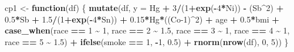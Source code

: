\documentclass[12pt, twoside]{amherstthesis}
\newenvironment{Shaded}{\begin{snugshade}}{\end{snugshade}}
\newcommand{\AttributeTok}[1]{\textcolor[rgb]{0.13,0.29,0.53}{#1}}
\newcommand{\ControlFlowTok}[1]{\textcolor[rgb]{0.13,0.29,0.53}{\textbf{#1}}}
\newcommand{\DecValTok}[1]{\textcolor[rgb]{0.00,0.00,0.81}{#1}}
\newcommand{\FloatTok}[1]{\textcolor[rgb]{0.00,0.00,0.81}{#1}}
\newcommand{\FunctionTok}[1]{\textcolor[rgb]{0.13,0.29,0.53}{\textbf{#1}}}
\newcommand{\NormalTok}[1]{#1}
\newcommand{\OtherTok}[1]{\textcolor[rgb]{0.56,0.35,0.01}{#1}}
\newcommand{\SpecialCharTok}[1]{\textcolor[rgb]{0.81,0.36,0.00}{\textbf{#1}}}
\begin{document}
\begin{Shaded}
\begin{Highlighting}[]
\NormalTok{cp1 }\OtherTok{\textless{}{-}} \ControlFlowTok{function}\NormalTok{(df) \{}
  \FunctionTok{mutate}\NormalTok{(df, }\AttributeTok{y =} 
\NormalTok{           Hg }\SpecialCharTok{+} \DecValTok{3}\SpecialCharTok{/}\NormalTok{(}\DecValTok{1}\SpecialCharTok{+}\FunctionTok{exp}\NormalTok{(}\SpecialCharTok{{-}}\DecValTok{4}\SpecialCharTok{*}\NormalTok{Ni)) }\SpecialCharTok{{-}}\NormalTok{ (Sb}\SpecialCharTok{\^{}}\DecValTok{2}\NormalTok{) }\SpecialCharTok{+} \FloatTok{0.5}\SpecialCharTok{*}\NormalTok{Sb }\SpecialCharTok{+} \FloatTok{1.5}\SpecialCharTok{/}\NormalTok{(}\DecValTok{1}\SpecialCharTok{+}\FunctionTok{exp}\NormalTok{(}\SpecialCharTok{{-}}\DecValTok{4}\SpecialCharTok{*}\NormalTok{Sn)) }\SpecialCharTok{+} 
           \FloatTok{0.15}\SpecialCharTok{*}\NormalTok{Hg}\SpecialCharTok{*}\NormalTok{((Co}\DecValTok{{-}1}\NormalTok{)}\SpecialCharTok{\^{}}\DecValTok{2}\NormalTok{) }\SpecialCharTok{+}
\NormalTok{           age }\SpecialCharTok{+} \FloatTok{0.5}\SpecialCharTok{*}\NormalTok{bmi }\SpecialCharTok{+} 
           \FunctionTok{case\_when}\NormalTok{(race }\SpecialCharTok{==} \DecValTok{1} \SpecialCharTok{\textasciitilde{}} \DecValTok{1}\NormalTok{, }
\NormalTok{                     race }\SpecialCharTok{==} \DecValTok{2} \SpecialCharTok{\textasciitilde{}} \FloatTok{1.5}\NormalTok{, }
\NormalTok{                     race }\SpecialCharTok{==} \DecValTok{3} \SpecialCharTok{\textasciitilde{}} \DecValTok{1}\NormalTok{, }
\NormalTok{                     race }\SpecialCharTok{==} \DecValTok{4} \SpecialCharTok{\textasciitilde{}} \DecValTok{1}\NormalTok{, }
\NormalTok{                     race }\SpecialCharTok{==} \DecValTok{5} \SpecialCharTok{\textasciitilde{}} \FloatTok{1.5}\NormalTok{) }\SpecialCharTok{+}
           \FunctionTok{ifelse}\NormalTok{(smoke }\SpecialCharTok{==} \DecValTok{1}\NormalTok{, }\SpecialCharTok{{-}}\DecValTok{1}\NormalTok{, }\FloatTok{0.5}\NormalTok{) }\SpecialCharTok{+}
           \FunctionTok{rnorm}\NormalTok{(}\FunctionTok{nrow}\NormalTok{(df), }\DecValTok{0}\NormalTok{, }\DecValTok{5}\NormalTok{))}
\NormalTok{\}}


\end{Highlighting}
\end{Shaded}
\end{document}
